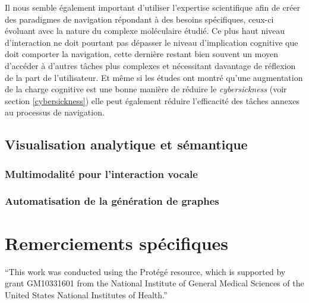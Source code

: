 Il nous semble également important d'utiliser l'expertise scientifique afin de créer des paradigmes de navigation répondant à des besoins spécifiques, ceux-ci évoluant avec la nature du complexe moléculaire étudié. Ce plus haut niveau d'interaction ne doit pourtant pas dépasser le niveau d'implication cognitive que doit comporter la navigation, cette dernière restant bien souvent un moyen d'accéder à d'autres tâches plus complexes et nécessitant davantage de réflexion de la part de l'utilisateur. Et même si les études ont montré qu'une augmentation de la charge cognitive est une bonne manière de réduire le \textit{cybersickness} (voir section \ref{cybersickness}) elle peut également réduire l'efficacité des tâches annexes au processus de navigation.

\subsection*{Visualisation analytique et sémantique}

\subsubsection{Multimodalité pour l'interaction vocale}

\subsubsection{Automatisation de la génération de graphes}

\section*{Remerciements spécifiques}

“This work was conducted using the Protégé resource, which is supported by grant GM10331601 from the National Institute of General Medical Sciences of the United States National Institutes of Health.” 